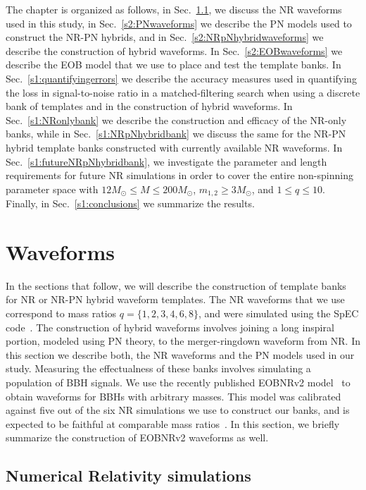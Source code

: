 The chapter is organized as follows, in Sec.~\ref{s2:NRwaveforms}, we discuss
the NR waveforms used in this study, in Sec.~\ref{s2:PNwaveforms} we
describe the PN models used to construct the NR-PN hybrids,  and in Sec.~\ref{s2:NRpNhybridwaveforms} we describe the
construction of hybrid waveforms. In Sec.~\ref{s2:EOBwaveforms} we 
describe the EOB model that we use to place and test the template
banks. In Sec.~\ref{s1:quantifyingerrors} we describe the accuracy
measures used in quantifying the loss in signal-to-noise ratio in a
matched-filtering search when using a discrete bank of templates and
in the construction of hybrid waveforms. In Sec.~\ref{s1:NRonlybank}
we describe the construction and efficacy of the NR-only banks, while in
Sec.~\ref{s1:NRpNhybridbank} we discuss the same for the NR-PN hybrid 
template banks constructed with currently available NR waveforms. In
Sec.~\ref{s1:futureNRpNhybridbank}, we investigate the parameter and length
requirements for future NR simulations in order to cover the entire 
non-spinning parameter space with $12 M_\odot\leq M\leq 200M_\odot$, 
$m_{1,2} \geq 3M_\odot$, and $1 \leq q \leq 10$. Finally, in 
Sec.~\ref{s1:conclusions} we summarize the results. 

\section{Waveforms}\label{s1:waveforms}

In the sections that follow, we will describe the construction of template 
banks for NR or NR-PN hybrid waveform templates. The NR waveforms that we
use correspond to mass ratios $q=\{1,2,3,4,6,8\}$, and were simulated using
the SpEC code~\cite{spec}. The construction of hybrid
waveforms involves joining a long inspiral portion, modeled using PN theory,
to the merger-ringdown waveform from NR. In this section we describe both, the 
NR waveforms and the PN models used in our study. Measuring the effectualness
of these banks involves simulating a population of BBH signals. We use the 
recently published EOBNRv2 model~\cite{BuonannoEOBv2Main} to obtain waveforms
for BBHs with arbitrary masses. This model was calibrated against five out of 
the six NR simulations we use to construct our banks, and is expected to be 
faithful at comparable mass ratios~\cite{BuonannoEOBv2Main}. In this section, 
we briefly summarize the construction of EOBNRv2 waveforms as well.

\subsection{Numerical Relativity simulations}\label{s2:NRwaveforms}

